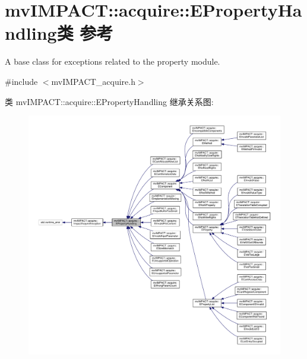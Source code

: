 \hypertarget{classmv_i_m_p_a_c_t_1_1acquire_1_1_e_property_handling}{\section{mv\+I\+M\+P\+A\+C\+T\+:\+:acquire\+:\+:E\+Property\+Handling类 参考}
\label{classmv_i_m_p_a_c_t_1_1acquire_1_1_e_property_handling}
}


A base class for exceptions related to the property module.  




{\ttfamily \#include $<$mv\+I\+M\+P\+A\+C\+T\+\_\+acquire.\+h$>$}



类 mv\+I\+M\+P\+A\+C\+T\+:\+:acquire\+:\+:E\+Property\+Handling 继承关系图\+:
\nopagebreak
\begin{figure}[H]
\begin{center}
\leavevmode
\includegraphics[width=350pt]{classmv_i_m_p_a_c_t_1_1acquire_1_1_e_property_handling__inherit__graph}
\end{center}
\end{figure}


